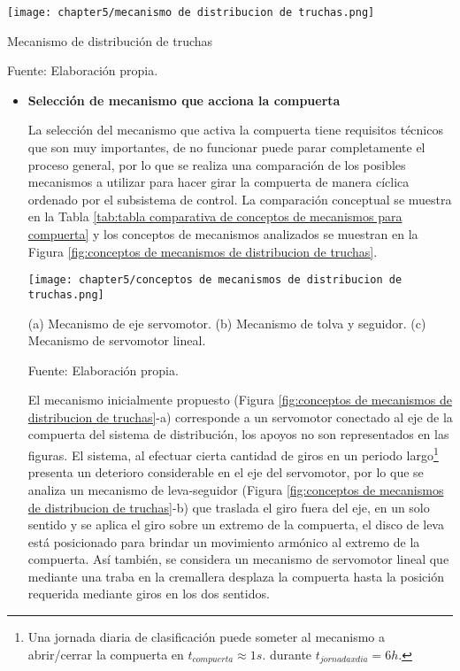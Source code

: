\begin{myfigure}[H]
	\centering
	\texttt{[image: chapter5/mecanismo de distribucion de truchas.png]}
	\caption{Mecanismo de distribución de truchas}
	\begin{myflushleftportland}
		Fuente: Elaboración propia.
	\end{myflushleftportland}
	\label{fig:mecanismo de distribucion de truchas}
\end{myfigure}

\begin{itemize}
	
	\item \textbf{Selección de mecanismo que acciona la compuerta}
	
	La selección del mecanismo que activa la compuerta tiene requisitos técnicos que son muy importantes, de no funcionar puede parar completamente el proceso general, por lo que se realiza una comparación de los posibles mecanismos a utilizar para hacer girar la compuerta de manera cíclica ordenado por el subsistema de control. La comparación conceptual se muestra en la Tabla \ref{tab:tabla comparativa de conceptos de mecanismos para compuerta} y los conceptos de mecanismos analizados se muestran en la Figura \ref{fig:conceptos de mecanismos de distribucion de truchas}.
	
	\begin{myfigure}[H]
		\centering
		\texttt{[image: chapter5/conceptos de mecanismos de distribucion de truchas.png]}
		\caption[Conceptos de mecanismos de distribución de truchas]{(a) Mecanismo de eje servomotor. (b) Mecanismo de tolva y seguidor. (c) Mecanismo de servomotor lineal.}
		\begin{myflushleftportland}
			Fuente: Elaboración propia.
		\end{myflushleftportland}
		\label{fig:conceptos de mecanismos de distribucion de truchas}
	\end{myfigure}

	El mecanismo inicialmente propuesto (Figura \ref{fig:conceptos de mecanismos de distribucion de truchas}-a) corresponde a un servomotor conectado al eje de la compuerta del sistema de distribución, los apoyos no son representados en las figuras. El sistema, al efectuar cierta cantidad de giros en un periodo largo\footnote{Una jornada diaria de clasificación puede someter al mecanismo a abrir/cerrar la compuerta en $t_{compuerta}\approx1 s.$ durante $t_{jornadaxdia}=6 h.$} presenta un deterioro considerable en el eje del servomotor, por lo que se analiza un mecanismo de leva-seguidor (Figura \ref{fig:conceptos de mecanismos de distribucion de truchas}-b) que traslada el giro fuera del eje, en un solo sentido y se aplica el giro sobre un extremo de la compuerta, el disco de leva está posicionado para brindar un movimiento armónico al extremo de la compuerta. Así también, se considera un mecanismo de servomotor lineal que mediante una traba en la cremallera desplaza la compuerta hasta la posición requerida mediante giros en los dos sentidos.
	

\end{itemize}
